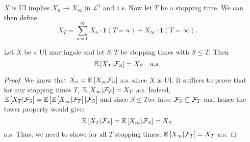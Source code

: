 \documentclass{article}
\begin{document}
$ X$ is UI implies $ X_{n}\to X_{\infty}$ in $ \mathcal{L}^{1} $ and a.s. Now let $ T$ be a stopping time. We can then define 
\[
X_{T} =\displaystyle\sum^{\infty}_{n=0}X_{n}\cdot \mathbf{1}(T=n) + X_{\infty}\cdot \mathbf{1}(T=\infty).
\]

\begin{theorem}\label{thm: OST for UI mg}
Let $ X$ be a UI martingale and let $ S, T$ be stopping times with $ S\leq T$. Then 
\[\mathbb{E}\left[ X_{T}|\mathcal{F}_{S} \right] = X_{S} \quad \text{a.s.}
\]

\end{theorem}

\begin{proof}
    We know that $ X_{n} = \mathbb{E}\left[ X_{\infty}\mathcal{F}_{n} \right]$ a.s. since $ X$ is UI. It suffices to prove that for any stopping times $ T$, $ \mathbb{E}\left[ X_{\infty}|\mathcal{F}_{T} \right] = X_{T}$ a.s. Indeed, $ \mathbb{E}\left[ X_{T}|\mathcal{F}_{S} \right] = \mathbb{E}\left[ \mathbb{E}\left[ X_{\infty}|\mathcal{F}_{T} \right]|\mathcal{F}_{S} \right]$ and since $ S\leq T$we have $ \mathcal{F}_{S}\subseteq \mathcal{F}_{T}$ and hence the tower property would give: 
    \[
    \mathbb{E}\left[ X_{T}|\mathcal{F}_{S} \right] = \mathbb{E}\left[ X_{\infty}|\mathcal{F}_{S} \right] = X_{S}
    \]
    a.s. 
    Thus, we need to show: for all $ T$ stopping times, $ \mathbb{E}\left[ X_{\infty}|\mathcal{F}_{T} \right] = X_{T}$ a.s. 


\end{proof}
\end{document}
